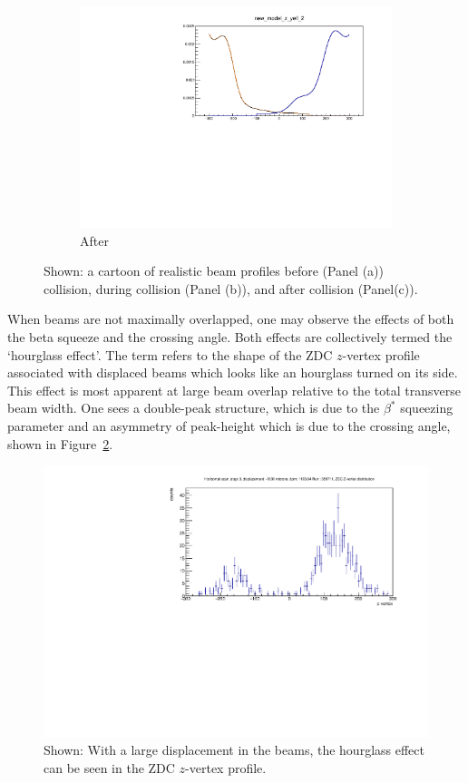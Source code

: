 \begin{figure}[ht]
\begin{subfigure}{0.7\linewidth}
    \includegraphics[width=\textwidth]{./figures/359711_time_step_2_bunch_collision.pdf}
    \caption{After}
  \end{subfigure}
  \caption{
    Shown: a cartoon of realistic beam profiles before (Panel (a)) collision,
    during collision (Panel (b)), and after collision (Panel(c)).
  }
  \label{fig:beam_profile_overlap}
\end{figure}

When beams are not maximally overlapped, one may observe the effects of both the
beta squeeze and the crossing angle. Both effects are collectively termed the
`hourglass effect'.  The term refers to the shape of the ZDC $z$-vertex profile
associated with displaced beams which looks like an hourglass turned on its
side. This effect is most apparent at large beam overlap relative to the total
transverse beam width. One sees a double-peak structure, which is due to the
$\beta^*$ squeezing parameter and an asymmetry of peak-height which is due to
the crossing angle, shown in Figure~\ref{fig:zdc_beam_displacement}. 

\begin{figure}[h]
  \centering
  \includegraphics[width=0.8\linewidth]{./figures/zdc_zvertex_max_displacement_359711.pdf}
  \caption{
    Shown: With a large displacement in the beams, the hourglass effect can be
    seen in the ZDC $z$-vertex profile.
  }
  \label{fig:zdc_beam_displacement}
\end{figure}

